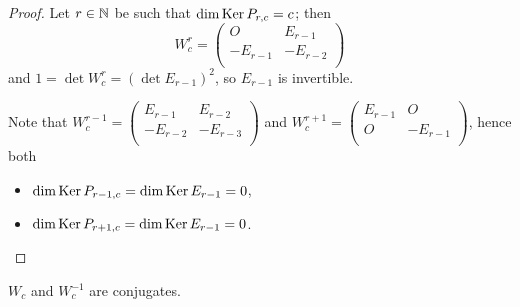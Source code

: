 \begin{proof}
  Let $r\in\mathbb{N}$ be such that $\dim\operatorname{Ker} P_{r,c} = c$; then
  \[
  W_{c}^{r}
  =
  \left(
  \begin{array}{cc}
     O    &  E_{r-1}  \\
    -E_{r-1} & -E_{r-2} \\
  \end{array}
  \right)
  \]
  and $1 = \det W_{c}^{r} = (\det E_{r-1})^{2}$, so $E_{r-1}$ is
  invertible.

  Note that
  $W_{c}^{r-1} = \left(\begin{smallmatrix} E_{r-1} & E_{r-2} \\-E_{r-2} & -E_{r-3} \\\end{smallmatrix}\right)$
  and
  $W_{c}^{r+1} = \left(\begin{smallmatrix} E_{r-1} & O \\ O & -E_{r-1} \\\end{smallmatrix}\right)$,
  hence both
  \begin{itemize}
    \item $\dim\operatorname{Ker} P_{r-1,c} = \dim\operatorname{Ker} E_{r-1} = 0$,
    \item $\dim\operatorname{Ker} P_{r+1,c} = \dim\operatorname{Ker} E_{r-1} = 0$.
  \end{itemize}
\end{proof}

\begin{lemma}
  $W_{c}$ and $W_{c}^{-1}$ are conjugates.
\end{lemma}

